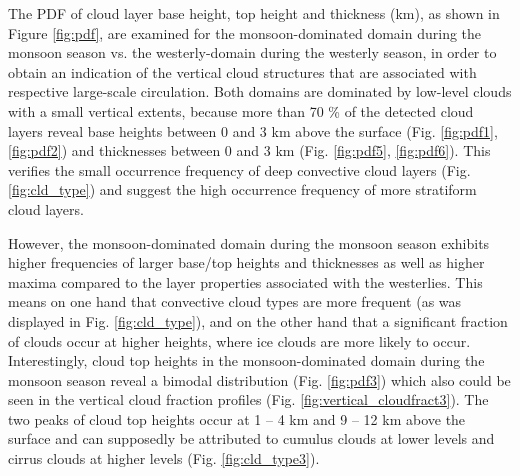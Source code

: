 \documentclass[alpha-refs]{wiley-article}
\begin{document}
The PDF of cloud layer base height, top height and thickness (km), as shown in Figure \ref{fig:pdf}, are examined for the monsoon-dominated domain during the monsoon season vs. the westerly-domain during the westerly season, in order to obtain an indication of the vertical cloud structures that are associated with respective large-scale circulation. Both domains are dominated by low-level clouds with a small vertical extents, because more than 70 \% of the detected cloud layers reveal base heights between 0 and 3 km above the surface (Fig. \ref{fig:pdf1}, \ref{fig:pdf2}) and thicknesses between 0 and 3 km (Fig. \ref{fig:pdf5}, \ref{fig:pdf6}). This verifies the small occurrence frequency of deep convective cloud layers (Fig. \ref{fig:cld_type}) and suggest the high occurrence frequency of more stratiform cloud layers. 

However, the monsoon-dominated domain during the monsoon season exhibits higher frequencies of larger base/top heights and thicknesses as well as higher maxima compared to the layer properties associated with the westerlies. This means on one hand that convective cloud types are more frequent (as was displayed in Fig. \ref{fig:cld_type}), and on the other hand that a significant fraction of clouds occur at higher heights, where ice clouds are more likely to occur. Interestingly, cloud top heights in the monsoon-dominated domain during the monsoon season reveal a bimodal distribution (Fig. \ref{fig:pdf3}) which also could be seen in the vertical cloud fraction profiles (Fig. \ref{fig:vertical_cloudfract3}). The two peaks of cloud top heights occur at 1 -- 4 km and 9 -- 12 km above the surface and can supposedly be attributed to cumulus clouds at lower levels and cirrus clouds at higher levels (Fig. \ref{fig:cld_type3}). 
\end{document}
